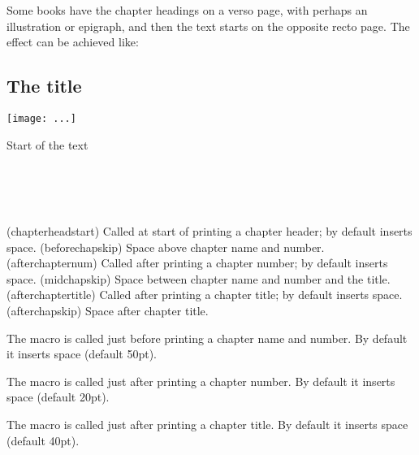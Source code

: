     Some books have the chapter headings on a verso page, with perhaps
an illustration or epigraph, and
then the text starts on the opposite
recto page. The effect can be achieved like:
\begin{lcode}
\openleft                %
\chapter{The title}      %
\begin{centering}        %
\texttt{[image: ...]}
\end{centering}
\clearpage               %
Start of the text        %
\end{lcode}


\begin{syntax}
\cmd{\chapterheadstart} \lnc{\beforechapskip} \\
\cmd{\afterchapternum} \lnc{\midchapskip} \\
\cmd{\afterchaptertitle} \lnc{\afterchapskip} \\
\end{syntax}
\glossary(chapterheadstart)%
  {}%
  {Called at start of printing a chapter header; by default inserts  space.}
\glossary(beforechapskip)%
  {}%
  {Space above chapter name and number.}
\glossary(afterchapternum)%
  {}%
  {Called after printing a chapter number; by default inserts  space.}
\glossary(midchapskip)%
  {}%
  {Space between chapter name and number and the title.}
\glossary(afterchaptertitle)%
  {}%
  {Called after printing a chapter title; by default inserts  space.}
\glossary(afterchapskip)%
  {}%
  {Space after chapter title.}

The macro \cmd{\chapterheadstart} is called just before printing a chapter
name and number. By default it inserts \lnc{\beforechapskip} space (default
50pt).

The macro \cmd{\afterchapternum} is called just after printing a chapter
number. By default it inserts \lnc{\midchapskip} space (default
20pt).

The macro \cmd{\afterchaptertitle} is called just after printing a chapter
title. By default it inserts \lnc{\afterchapskip} space (default
40pt).

